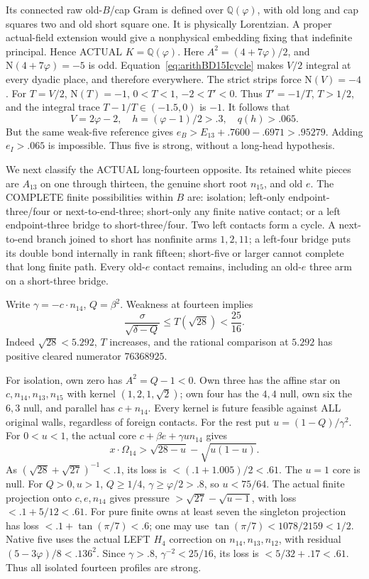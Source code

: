 \documentclass[11pt]{article}
\begin{document}
Its connected raw old-\(B\)/cap Gram is defined over
\(\mathbb Q(\varphi)\), with old long and cap squares
two and old short square one.
It is physically Lorentzian.
A proper actual-field extension would give a
nonphysical embedding fixing that indefinite principal.
Hence ACTUAL \(K=\mathbb Q(\varphi)\).
Here \(A^2=(4+7\varphi)/2\), and
\(\mathrm N(4+7\varphi)=-5\) is odd.
Equation~\eqref{eq:arithBD15Icycle} makes \(V/2\)
integral at every dyadic place, and therefore everywhere.
The strict strips force
\(\mathrm N(V)=-4\).
For \(T=V/2\), \(\mathrm N(T)=-1\), \(0<T<1\),
\(-2<T'<0\).
Thus \(T'=-1/T\), \(T>1/2\), and the integral trace
\(T-1/T\in(-1.5,0)\) is \(-1\).
It follows that
\[
          V=2\varphi-2,\quad h=(\varphi-1)/2>.3,\quad
          q(h)>.065 .
\]
But the same weak-five reference gives
\(e_B>E_{13}+.7600-.6971>.95279\).
Adding \(e_I>.065\) is impossible.
Thus five is strong, without a long-head hypothesis.

We next classify the ACTUAL long-fourteen opposite.
Its retained white pieces are \(A_{13}\) on one
through thirteen, the genuine short root \(n_{15}\),
and old \(e\).
The COMPLETE finite possibilities within \(B\) are:
isolation; left-only endpoint-three/four or next-to-end-three;
short-only any finite native contact;
or a left endpoint-three bridge to short-three/four.
Two left contacts form a cycle.
A next-to-end branch joined to short has nonfinite
arms \(1,2,11\); a left-four bridge puts its double
bond internally in rank fifteen; short-five or larger
cannot complete that long finite path.
Every old-\(e\) contact remains, including an old-\(e\)
three arm on a short-three bridge.

Write \(\gamma=-c\cdot n_{14}\), \(Q=\beta^2\).
Weakness at fourteen implies
\[
 {\frac{\sigma}{\sqrt{\delta-Q}}}\le T(\sqrt{28})<{\frac{25}{16}}.
\]
Indeed \(\sqrt{28}<5.292\), \(T\) increases,
and the rational comparison at \(5.292\) has positive
cleared numerator \(76368925\).

For isolation, own zero has \(A^2=Q-1<0\).
Own three has the affine star on \(c,n_{14},n_{13},n_{15}\)
with kernel \((1,2,1,\sqrt2)\);
own four has the \(4,4\) null, own six the \(6,3\)
null, and parallel has \(c+n_{14}\).
Every kernel is future feasible against ALL original
walls, regardless of foreign contacts.
For the rest put \(u=(1-Q)/\gamma^2\).
For \(0<u<1\), the actual core
\(c+\beta e+\gamma u n_{14}\) gives
\[
 x\cdot\Omega_{14}>
          \sqrt{28-u}-\sqrt{u(1-u)}.
\]
As \((\sqrt{28}+\sqrt{27})^{-1}<.1\), its loss is
\(<(.1+1.005)/2<.61\).
The \(u=1\) core is null.
For \(Q>0,u>1\), \(Q\ge1/4\),
\(\gamma\ge\varphi/2>.8\), so \(u<75/64\).
The actual finite projection onto \(c,e,n_{14}\)
gives pressure \(>\sqrt{27}-\sqrt{u-1}\),
with loss \(<.1+5/12<.61\).
For pure finite owns at least seven the singleton
projection has loss \(<.1+\tan(\pi/7)<.6\);
one may use \(\tan(\pi/7)<1078/2159<1/2\).
Native five uses the actual LEFT \(H_4\) correction on
\(n_{14},n_{13},n_{12}\), with residual
\((5-3\varphi)/8<.136^2\).
Since \(\gamma>.8\), \(\gamma^{-2}<25/16\),
its loss is \(<5/32+.17<.61\).
Thus all isolated fourteen profiles are strong.
\end{document}
